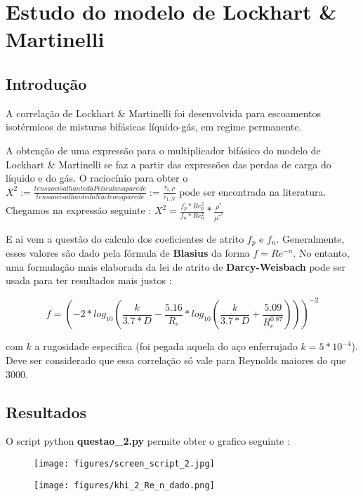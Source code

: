 \documentclass[a4paper, 11pt]{article}
\begin{document}
\section{Estudo do modelo de Lockhart \& Martinelli}

\subsection{Introdução}
A correlação de Lockhart \& Martinelli foi desenvolvida para escoamentos isotérmicos de misturas bifásicas líquido-gás, em regime permanente.

A obtenção de uma expressão para o multiplicador bifásico do modelo de Lockhart \& Martinelli se faz a partir das expressões das perdas de carga do líquido e do gás.
O raciocínio para obter o $ X^2:= \frac{tensao cisalhante da Pelicula na parede}{tensao cisalhante do Nucleo na parede} := \frac{\tau_{1,P}}{\tau_{1,N}} $ pode ser encontrada na literatura.
Chegamos na expressão seguinte :
$ X^2 = \frac{f_p*Re_p^2}{f_n*Re_n^2}*\frac{\rho^*}{\mu^{*^2}} $

E ai vem a questão do calculo dos coeficientes de atrito $f_p$ e $f_n$.
Generalmente, esses valores são dado pela fórmula de \textbf{Blasius} da forma
$f = Re^{-n}$.
No entanto, uma formulação mais elaborada da lei de atrito de \textbf{Darcy-Weisbach} pode ser usada para ter resultados mais justos :
\begin{center}
\[f = ( -2*log_{10}(\frac{k}{3.7*D} - \frac{5.16}{R_e}*log_{10}(\frac{k}{3.7*D} + \frac{5.09}{R_e^{0.87}})) )^{-2}\]
\end{center}
com $k$ a rugosidade especifica (foi pegada aquela do aço enferrujado $k=5*10^{-4}$).
Deve ser considerado que essa correlação só vale para Reynolds maiores do que 3000.

\subsection{Resultados}

O script python \textbf{questao\_2.py} permite obter o grafico seguinte :
\begin{figure}[H]
  \begin{center}
  \texttt{[image: figures/screen\_script\_2.jpg]}  
\end{center} \end{figure}
\begin{figure}[H]
  \begin{center}
  \texttt{[image: figures/khi\_2\_Re\_n\_dado.png]}  
\end{center} \end{figure}
\end{document}
